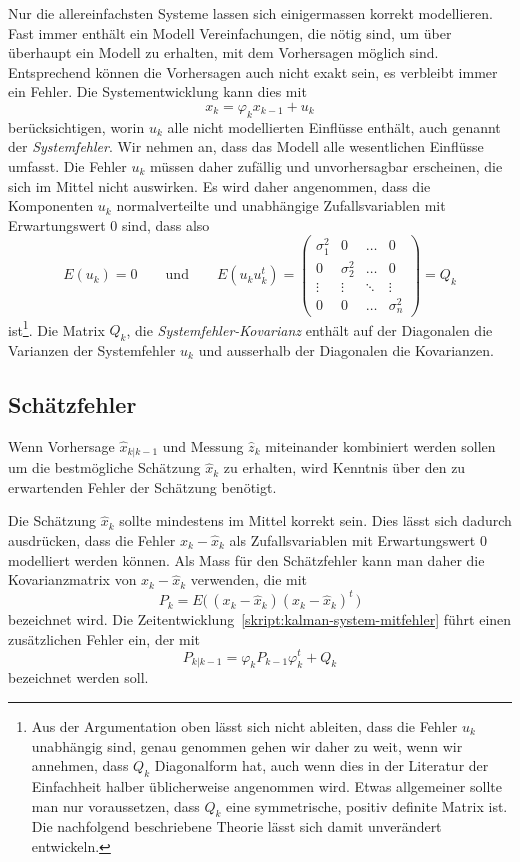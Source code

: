 Nur die allereinfachsten Systeme lassen sich einigermassen korrekt modellieren.
Fast immer enthält ein Modell Vereinfachungen, die nötig sind, um über
überhaupt ein Modell zu erhalten, mit dem Vorhersagen möglich sind.
Entsprechend können die Vorhersagen auch nicht exakt sein, es verbleibt
immer ein Fehler.
Die Systementwicklung kann dies mit
\begin{equation}
x_k = \varphi_k x_{k-1} + u_k
\label{skript:kalman-system-mitfehler}
\end{equation}
berücksichtigen, worin $u_k$ alle nicht modellierten Einflüsse
enthält, auch genannt der {\em Systemfehler}. 
Wir nehmen an, dass das Modell alle wesentlichen Einflüsse umfasst.
Die Fehler $u_k$ müssen daher zufällig und unvorhersagbar erscheinen,
die sich im Mittel nicht auswirken.
Es wird daher angenommen, dass die Komponenten $u_k$ normalverteilte
und unabhängige Zufallsvariablen mit Erwartungswert $0$ sind, dass also
\[
E(u_k)=0
\qquad\text{und}\qquad
E(u_ku_k^t)
=
\begin{pmatrix}
\sigma_1^2&0         &\dots &0\\
0         &\sigma_2^2&\dots &0\\
\vdots    &\vdots    &\ddots&\vdots\\
0         &0         &\dots &\sigma_n^2
\end{pmatrix}
=
Q_k
\]
ist\footnote{%
Aus der Argumentation oben lässt sich nicht ableiten, dass
die Fehler $u_k$ unabhängig sind, genau genommen gehen wir daher zu
weit, wenn wir annehmen, dass $Q_k$ Diagonalform hat, auch wenn dies
in der Literatur der Einfachheit halber üblicherweise angenommen wird.
Etwas allgemeiner sollte man nur voraussetzen, dass $Q_k$ eine symmetrische,
positiv definite Matrix ist.
Die nachfolgend beschriebene Theorie lässt sich damit unverändert
entwickeln.
}.
Die Matrix $Q_k$, die {\em Systemfehler-Kovarianz}
enthält auf der Diagonalen die Varianzen der Systemfehler $u_k$ 
und ausserhalb der Diagonalen die Kovarianzen.

\subsection{Schätzfehler\label{subsection:schaetzfehler}}
Wenn Vorhersage $\hat{x}_{k|k-1}$ und Messung $\hat{z}_k$ 
miteinander kombiniert werden sollen um die bestmögliche Schätzung
$\hat{x}_k$ zu erhalten, wird Kenntnis über den zu erwartenden
Fehler der Schätzung benötigt.

Die Schätzung $\hat{x}_k$ sollte mindestens im Mittel korrekt sein.
Dies lässt sich dadurch ausdrücken, dass die Fehler $x_k - \hat{x}_k$
als Zufallsvariablen mit Erwartungswert $0$ modelliert werden können.
Als Mass für den Schätzfehler kann man daher die Kovarianzmatrix von
%
$x_k-\hat{x}_k$ verwenden, die mit
\[
P_k =  E\bigl(\, (x_k-\hat{x}_k) (x_k-\hat{x}_k)^t\,\bigr)
\]
bezeichnet wird.
Die Zeitentwicklung~\eqref{skript:kalman-system-mitfehler} führt einen
zusätzlichen Fehler ein, der mit
\begin{equation}
P_{k|k-1} = \varphi_k P_{k-1} \varphi_k^t + Q_k
\label{skript:kalman:fehlerentwicklung}
\end{equation}
bezeichnet werden soll.

